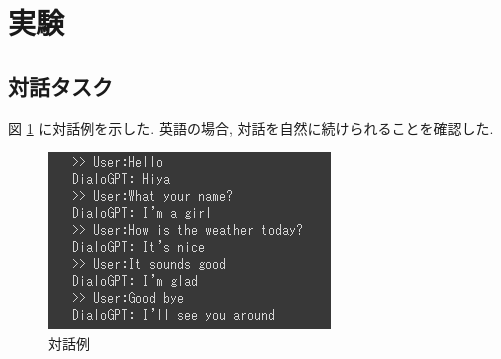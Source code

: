\documentclass[twocolumn]{jarticle}     %
\begin{document}
\section{実験}

\subsection{対話タスク}

図 \ref{fig:con} に対話例を示した.
英語の場合, 対話を自然に続けられることを確認した.

\begin{figure}[tb]
  \begin{center}
    \includegraphics[clip,width=75mm]{ss.png}
    \caption{対話例}
    \label{fig:con}
  \end{center}
\end{figure}





\end{document}
